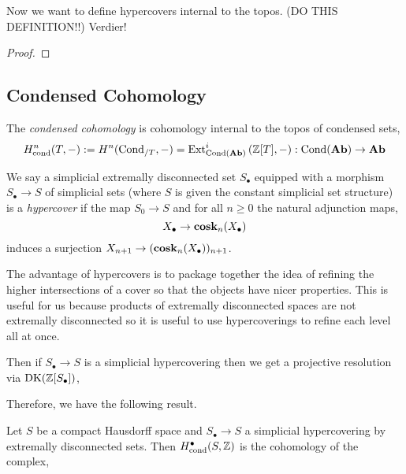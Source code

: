 \documentclass[12pt]{article}
\newcommand{\cond}{\text{cond}}
\newcommand{\Cond}{\mathrm{Cond}}
\newcommand{\DK}{\mathrm{DK}}
\begin{document}
Now we want to define hypercovers internal to the topos. (DO THIS DEFINITION!!) Verdier!

\begin{proof}

\end{proof}


\subsection{Condensed Cohomology}

\newcommand{\CHaus}{\mathbf{CHaus}}

\begin{defn}
The \textit{condensed cohomology} is cohomology internal to the topos of condensed sets,
\[ H^n_{\cond}(T, -) := H^n(\Cond_{/T}, -) = \Ext{i}{\Cond(\Ab)}{\Z[T]}{-} : \Cond(\Ab) \to \Ab \]
\end{defn}


\begin{defn}
We say a simplicial extremally disconnected set $S_\bullet$ equipped with a morphism $S_\bullet \to S$ of simplicial sets (where $S$ is given the constant simplicial set structure) is a \textit{hypercover} if the map $S_0 \to S$ and for all $n \ge 0$ the natural adjunction maps,
\[ X_\bullet \to \operatorname{\mathbf{cosk}}_n(X_\bullet) \]
induces a surjection $X_{n+1} \to (\operatorname{\mathbf{cosk}}_n(X_\bullet))_{n+1}$. 
\end{defn}

\begin{rmk}
The advantage of hypercovers is to package together the idea of refining the higher intersections of a cover so that the objects have nicer properties. This is useful for us because products of extremally disconnected spaces are not extremally disconnected so it is useful to use hypercoverings to refine each level all at once.
\end{rmk}

Then if $S_\bullet \to S$ is a simplicial hypercovering then we get a projective resolution via $\DK(\Z[S_\bullet])$,
\begin{center}
\end{center}

Therefore, we have the following result.

\begin{prop}
Let $S$ be a compact Hausdorff space and $S_\bullet \to S$ a simplicial hypercovering by extremally disconnected sets. Then $H^{\bullet}_{\cond}(S, \Z)$ is the cohomology of the complex,
\begin{center}
\end{center}
\end{prop}
\end{document}
